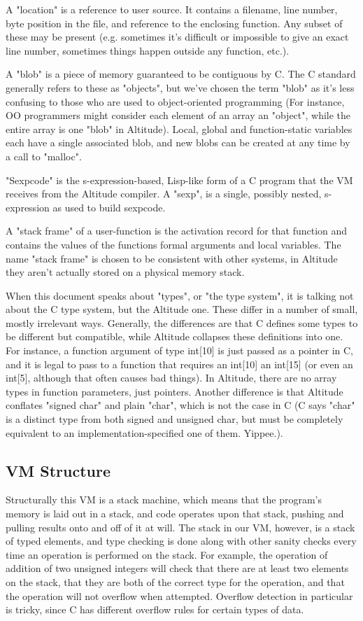 \documentclass[10pt,a4paper]{report}
\begin{document}
A "location" is a reference to user source. It contains a filename, line number, byte position in the file, and reference to the enclosing function. Any subset of these may be present (e.g. sometimes it's difficult or impossible to give an exact line number, sometimes things happen outside any function, etc.).

A "blob" is a piece of memory guaranteed to be contiguous by C. The C standard generally refers to these as "objects", but we've chosen the term "blob" as it's less confusing to those who are used to object-oriented programming (For instance, OO programmers might consider each element of an array an "object", while the entire array is one "blob" in Altitude). Local, global and function-static variables each have a single associated blob, and new blobs can be created at any time by a call to "malloc".

"Sexpcode" is the s-expression-based, Lisp-like form of a C program that the VM receives from the Altitude compiler. A "sexp", is a single, possibly nested, s-expression as used to build sexpcode.

A "stack frame" of a user-function is the activation record for that function and contains the values of the functions formal arguments and local variables. The name "stack frame" is chosen to be consistent with other systems, in Altitude they aren't actually stored on a physical memory stack.

When this document speaks about "types", or "the type system", it is talking not about the C type system, but the Altitude one. These differ in a number of small, mostly irrelevant ways. Generally, the differences are that C defines some types to be different but compatible, while Altitude collapses these definitions into one. For instance, a function argument of type int[10] is just passed as a pointer in C, and it is legal to pass to a function that requires an int[10] an int[15] (or even an int[5], although that often causes bad things). In Altitude, there are no array types in function parameters, just pointers. Another difference is that Altitude conflates "signed char" and plain "char", which is not the case in C (C says "char" is a distinct type from both signed and unsigned char, but must be completely equivalent to an implementation-specified one of them. Yippee.).


\subsection{VM Structure}
Structurally this VM is a stack machine, which means that the program's memory is laid out in a stack, and code operates upon that stack, pushing and pulling results onto and off of it at will. The stack in our VM, however, is a stack of typed elements, and type checking is done along with other sanity checks every time an operation is performed on the stack. For example, the operation of addition of two unsigned integers will check that there are at least two elements on the stack, that they are both of the correct type for the operation, and that the operation will not overflow when attempted. Overflow detection in particular is tricky, since C has different overflow rules for certain types of data.
\end{document}
